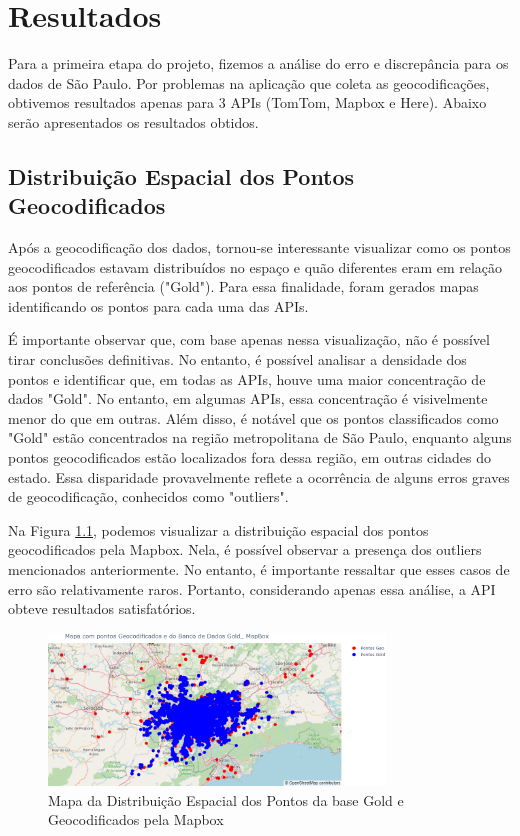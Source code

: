 \chapter{Resultados} \label{resultado}

Para a primeira etapa do projeto, fizemos a análise do erro e discrepância para os dados de São Paulo. Por problemas na aplicação que coleta as geocodificações, obtivemos resultados apenas para 3 APIs (TomTom, Mapbox e Here). Abaixo serão apresentados os resultados obtidos.

\section{Distribuição Espacial dos Pontos Geocodificados}

Após a geocodificação dos dados, tornou-se interessante visualizar como os pontos geocodificados estavam distribuídos no espaço e quão diferentes eram em relação aos pontos de referência ("Gold"). Para essa finalidade, foram gerados mapas identificando os pontos para cada uma das APIs.

É importante observar que, com base apenas nessa visualização, não é possível tirar conclusões definitivas. No entanto, é possível analisar a densidade dos pontos e identificar que, em todas as APIs, houve uma maior concentração de dados "Gold". No entanto, em algumas APIs, essa concentração é visivelmente menor do que em outras. Além disso, é notável que os pontos classificados como "Gold" estão concentrados na região metropolitana de São Paulo, enquanto alguns pontos geocodificados estão localizados fora dessa região, em outras cidades do estado. Essa disparidade provavelmente reflete a ocorrência de alguns erros graves de geocodificação, conhecidos como "outliers".

Na Figura \ref{fig:mapapontos1}, podemos visualizar a distribuição espacial dos pontos geocodificados pela Mapbox. Nela, é possível observar a presença dos outliers mencionados anteriormente. No entanto, é importante ressaltar que esses casos de erro são relativamente raros. Portanto, considerando apenas essa análise, a API obteve resultados satisfatórios.

\begin{figure}[h] 
  \centering
  \includegraphics[width=0.8\textwidth]{Figuras/mapapontos1.png}
  \caption{Mapa da Distribuição Espacial dos Pontos da base Gold e Geocodificados pela Mapbox}
  \label{fig:mapapontos1}
\end{figure}

